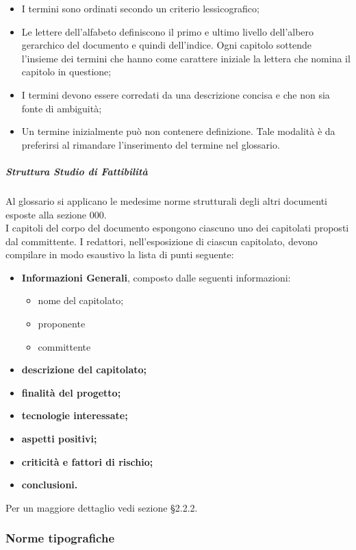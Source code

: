 					\begin{itemize}
						\item I  termini sono ordinati secondo un criterio lessicografico; 
						\item Le lettere dell'alfabeto definiscono il primo e ultimo livello dell’albero gerarchico del documento e quindi dell’indice. Ogni capitolo sottende l’insieme dei termini che hanno come carattere iniziale la lettera che nomina il capitolo in questione; 
						\item I termini devono essere corredati da una descrizione concisa e che non sia fonte di ambiguità; 
						\item Un termine inizialmente può non contenere definizione. Tale modalità è da preferirsi al rimandare l’inserimento del termine nel glossario.
					\end{itemize}
				\subparagraph{Struttura Studio di Fattibilità}
					Al glossario si applicano le medesime norme strutturali degli altri documenti esposte alla sezione 000. \\
					I capitoli del corpo del documento espongono ciascuno uno dei capitolati proposti dal committente. I redattori, nell’esposizione di ciascun capitolato, devono compilare in modo esaustivo la lista di punti seguente: 
					\begin{itemize}
						\item\textbf{Informazioni Generali}, composto dalle seguenti informazioni:
							\begin{itemize}
								\item nome del capitolato;
								\item proponente
								\item committente
							\end{itemize}
						\item\textbf{descrizione del capitolato;}
						\item\textbf{finalità del progetto;}
						\item\textbf{tecnologie interessate;}
						\item\textbf{aspetti positivi;}
						\item\textbf{criticità e fattori di rischio;}
						\item\textbf{conclusioni.}
					\end{itemize}
					Per un maggiore dettaglio vedi sezione §2.2.2.
		\subsubsection{Norme tipografiche}
